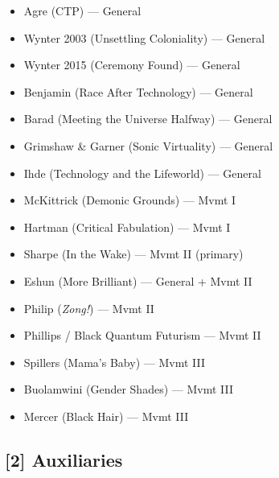\begin{itemize}[noitemsep]
    \item Agre (CTP) — General
    \item Wynter 2003 (Unsettling Coloniality) — General
    \item Wynter 2015 (Ceremony Found) — General
    \item Benjamin (Race After Technology) — General
    \item Barad (Meeting the Universe Halfway) — General
    \item Grimshaw \& Garner (Sonic Virtuality) — General
    \item Ihde (Technology and the Lifeworld) — General
    \item McKittrick (Demonic Grounds) — Mvmt I
    \item Hartman (Critical Fabulation) — Mvmt I
    \item Sharpe (In the Wake) — Mvmt II (primary)
    \item Eshun (More Brilliant) — General + Mvmt II
    \item Philip (\textit{Zong!}) — Mvmt II
    \item Phillips / Black Quantum Futurism — Mvmt II
    \item Spillers (Mama's Baby) — Mvmt III
    \item Buolamwini (Gender Shades) — Mvmt III
    \item Mercer (Black Hair) — Mvmt III
\end{itemize}

\subsection*{[2] Auxiliaries}

